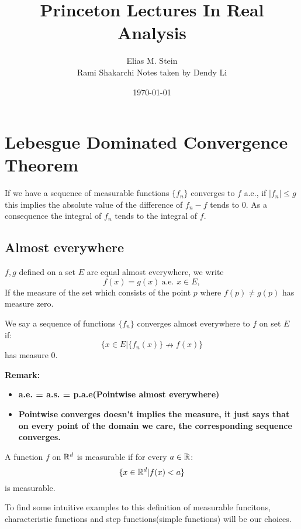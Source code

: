 \documentclass[11pt]{article}
\author{Elias M. Stein \\
Rami Shakarchi Notes taken by Dendy Li}
\date{\today}
\title{\elzevier Princeton Lectures In Real Analysis}
\begin{document}
\maketitle
\tableofcontents

\section{Lebesgue Dominated Convergence Theorem}
\label{sec:org82b0a70}
\begin{definition}
If we have a sequence of measurable functions \(\{f_n\}\) converges to \(f\) a.e., if \(\lvert f_n \rvert \leq g\) this implies the absolute value of the difference of \(f_n - f\) tends to \(0\). As a consequence the integral of \(f_n\) tends to the integral of \(f\).
\end{definition}
\subsection{Almost everywhere}
\label{sec:orgd49cad9}
\begin{definition}
\(f,g\) defined on a set \(E\) are equal almost everywhere, we write
\[
f(x) = g(x) \ \text{a.e. } x\in E,
\]
If the measure of the set which consists of the point \(p\) where \(f(p) \neq g(p)\) has measure zero.
\end{definition}

\begin{definition}
We say a sequence of functions \(\{f_n\}\) converges almost everywhere to \(f\) on set \(E\) if:
\[
\{x\in E | \{f_n(x)\} \nrightarrow f(x)\}
\]
has measure \(0\).
\end{definition}
\textbf{Remark:}
\begin{itemize}
\item \textbf{a.e. = a.s. = p.a.e(Pointwise almost everywhere)}
\item \textbf{Pointwise converges doesn't implies the measure, it just says that on every point of the domain we care, the corresponding sequence converges.}
\end{itemize}

\begin{definition}
A function \(f\) on \(\mathbb{R}^d\) is measurable if for every \(a \in \mathbb{R}\):
\[
\{x \in \mathbb{R}^d \vert f(x) < a\}
\]
is measurable.
\end{definition}

To find some intuitive examples to this definition of measurable funcitons, characteristic functions and step functions(simple functions) will be our choices.
\end{document}

